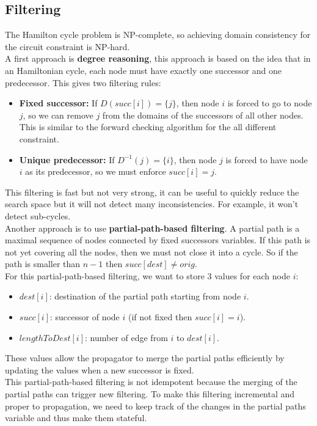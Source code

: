 \documentclass[12pt, openany]{report}
\theoremstyle{definition}
\begin{document}
\subsection{Filtering}
The Hamilton cycle problem is NP-complete, so achieving domain consistency for the circuit constraint is NP-hard.\\
A first approach is \textbf{degree reasoning}, this approach is based on the idea that in an Hamiltonian cycle, each node must have exactly one successor and one predecessor. This gives two filtering rules:
\begin{itemize}
    \item \textbf{Fixed successor:} If $D(succ[i]) = \{j\}$, then node $i$ is forced to go to node $j$, so we can remove $j$ from the domains of the successors of all other nodes. This is similar to the forward checking algorithm for the all different constraint.
    \item \textbf{Unique predecessor:} If $D^{-1}(j) = \{i\}$, then node $j$ is forced to have node $i$ as its predecessor, so we must enforce $succ[i] = j$.
\end{itemize}
This filtering is fast but not very strong, it can be useful to quickly reduce the search space but it will not detect many inconsistencies. For example, it won't detect sub-cycles.\\
Another approach is to use \textbf{partial-path-based filtering}. A partial path is a maximal sequence of nodes connected by fixed successors variables. If this path is not yet covering all the nodes, then we must not close it into a cycle. So if the path is smaller than $n-1$ then $succ[dest] \neq orig$.\\
For this partial-path-based filtering, we want to store 3 values for each node $i$: 
\begin{itemize}
    \item $dest[i]$: destination of the partial path starting from node $i$.
    \item $succ[i]$: successor of node $i$ (if not fixed then $succ[i] = i$).
    \item $lengthToDest[i]$: number of edge from $i$ to $dest[i]$.
\end{itemize} 
These values allow the propagator to merge the partial paths efficiently by updating the values when a new successor is fixed.\\
This partial-path-based filtering is not idempotent because the merging of the partial paths can trigger new filtering. To make this filtering incremental and proper to propagation, we need to keep track of the changes in the partial paths variable and thus make them stateful.\\
\end{document}
